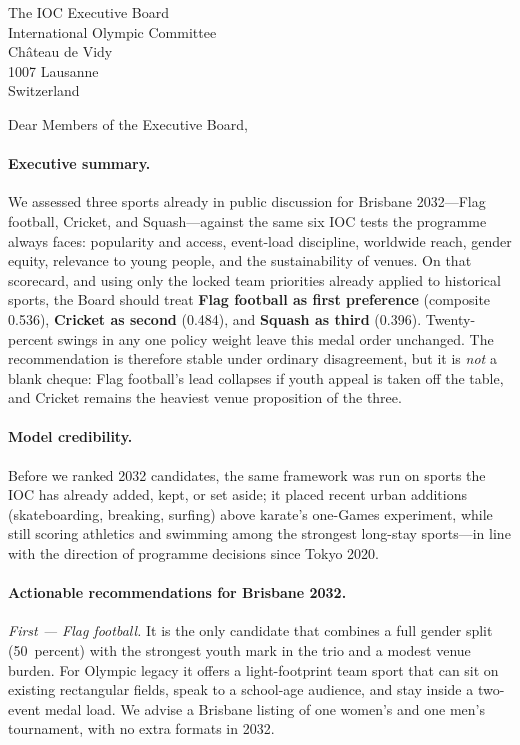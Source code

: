 \documentclass[12pt]{letter}
\date{19 September 2026}
\begin{document}
\begin{letter}{The IOC Executive Board\\
International Olympic Committee\\
Ch\^{a}teau de Vidy\\
1007 Lausanne\\
Switzerland}

\opening{Dear Members of the Executive Board,}


\paragraph{Executive summary.}
We assessed three sports already in public discussion for Brisbane 2032---Flag
football, Cricket, and Squash---against the same six IOC tests the programme
always faces: popularity and access, event-load discipline, worldwide reach,
gender equity, relevance to young people, and the sustainability of venues.
On that scorecard, and using only the locked team priorities already applied
to historical sports, the Board should treat \textbf{Flag football as first
preference} (composite 0.536), \textbf{Cricket as second} (0.484), and
\textbf{Squash as third} (0.396). Twenty-percent swings in any one policy
weight leave this medal order unchanged. The recommendation is therefore
stable under ordinary disagreement, but it is \emph{not} a blank cheque:
Flag football's lead collapses if youth appeal is taken off the table, and
Cricket remains the heaviest venue proposition of the three.

\paragraph{Model credibility.}
Before we ranked 2032 candidates, the same framework was run on sports the
IOC has already added, kept, or set aside; it placed recent urban additions
(skateboarding, breaking, surfing) above karate's one-Games experiment, while
still scoring athletics and swimming among the strongest long-stay sports---in
line with the direction of programme decisions since Tokyo 2020.

\paragraph{Actionable recommendations for Brisbane 2032.}
\textit{First --- Flag football.} It is the only candidate that combines a
full gender split (50~percent) with the strongest youth mark in the trio and
a modest venue burden. For Olympic legacy it offers a light-footprint team
sport that can sit on existing rectangular fields, speak to a school-age
audience, and stay inside a two-event medal load. We advise a Brisbane
listing of one women's and one men's tournament, with no extra formats in
2032.


\end{letter}
\end{document}
